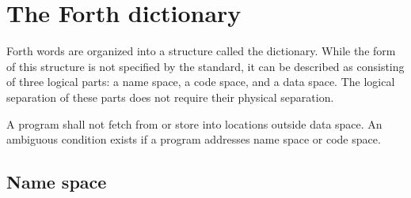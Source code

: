 \ifrelease\else
\newcommand{\extension}[3][\empty]{%
	\let\mod=\relax%
	\ifx+#1\let\mod=\uline\fi%
	\ifx-#1\let\mod=\sout\fi%
	\ifx\mod\relax\else\cbstart\fi%
	\parbox[t]{0.3\textwidth}{\mod{\texttt{#2}}}
	\quad
	\parbox[t]{0.6\textwidth}{\mod{#3}}
	\ifx\mod\relax\else\cbend\fi%
	\\
}

\newenvironment{extensions}{%
	\smallskip
	\begin{center}
	\rule[6pt]{0.95\textwidth}{0.4pt}\\[-2ex]
	\rule[8pt]{0.95\textwidth}{0.4pt}\\[-2ex]
	\parbox[t]{0.3\textwidth}{String} \quad
	\parbox[t]{0.6\textwidth}{Meaning}
	\rule[8pt]{0.95\textwidth}{0.3pt}\\[-2ex]
}{
	\rule[6pt]{0.95\textwidth}{0.4pt}\\[-2ex]
	\rule[8pt]{0.95\textwidth}{0.4pt}\\[-2ex]
	\end{center}
}

\fi

\section{The Forth dictionary} %
\label{usage:dict}

Forth words are organized into a structure called the dictionary.
While the form of this structure is not specified by the standard,
it can be described as consisting of three logical parts:
a name space, a code space, and a data space. The logical separation
of these parts does not require their physical separation.

A program shall not fetch from or store into locations outside data
space. An ambiguous condition exists if a program addresses name
space or code space.

\subsection{Name space} %

